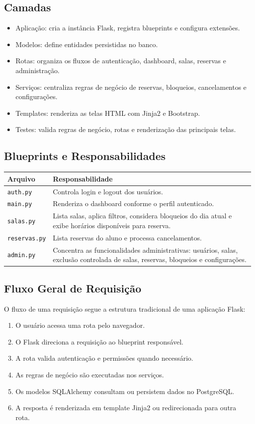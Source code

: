 \documentclass[12pt,a4paper]{article}
\begin{document}
\subsection{Camadas}
\begin{itemize}
    \item Aplicação: cria a instância Flask, registra blueprints e configura extensões.
    \item Modelos: define entidades persistidas no banco.
    \item Rotas: organiza os fluxos de autenticação, dashboard, salas, reservas e administração.
    \item Serviços: centraliza regras de negócio de reservas, bloqueios, cancelamentos e configurações.
    \item Templates: renderiza as telas HTML com Jinja2 e Bootstrap.
    \item Testes: valida regras de negócio, rotas e renderização das principais telas.
\end{itemize}

\subsection{Blueprints e Responsabilidades}
\begin{longtable}{|p{4cm}|p{10.5cm}|}
\hline
\textbf{Arquivo} & \textbf{Responsabilidade} \\ \hline
\texttt{auth.py} & Controla login e logout dos usuários. \\ \hline
\texttt{main.py} & Renderiza o dashboard conforme o perfil autenticado. \\ \hline
\texttt{salas.py} & Lista salas, aplica filtros, considera bloqueios do dia atual e exibe horários disponíveis para reserva. \\ \hline
\texttt{reservas.py} & Lista reservas do aluno e processa cancelamentos. \\ \hline
\texttt{admin.py} & Concentra as funcionalidades administrativas: usuários, salas, exclusão controlada de salas, reservas, bloqueios e configurações. \\ \hline
\end{longtable}

\subsection{Fluxo Geral de Requisição}
O fluxo de uma requisição segue a estrutura tradicional de uma aplicação Flask:
\begin{enumerate}
    \item O usuário acessa uma rota pelo navegador.
    \item O Flask direciona a requisição ao blueprint responsável.
    \item A rota valida autenticação e permissões quando necessário.
    \item As regras de negócio são executadas nos serviços.
    \item Os modelos SQLAlchemy consultam ou persistem dados no PostgreSQL.
    \item A resposta é renderizada em template Jinja2 ou redirecionada para outra rota.
\end{enumerate}
\end{document}
